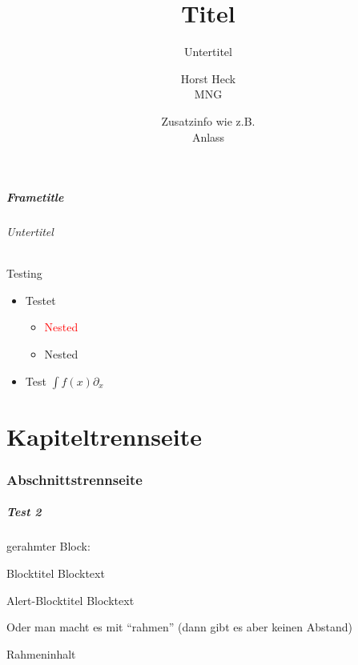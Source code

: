 \documentclass[mathsf,aspectratio=169]{beamer}
\title{Titel}
\subtitle{Untertitel}
\date[ISPN ’80]{Zusatzinfo wie z.B. \\ Anlass}
\author[Heck]{Horst Heck \\ MNG}
\institute{Technik und Informatik}
\begin{document}
	\begin{frame}
		\titlepage
	\end{frame}
	
	\begin{frame}[t]
		\frametitle{Frametitle}
		\framesubtitle{Untertitel}
		Testing
		\begin{itemize}
			\item Testet
			\begin{itemize}
				\item \textcolor{red}{Nested} 
				\pause
				\item Nested
			\end{itemize}
			\item Test $\int f(x) \partial_x$
		\end{itemize}
	\end{frame}
	
	\part{Kapiteltrennseite}
	\frame{\partpage}
	
	\section{Abschnittstrennseite}
		\begin{frame}
			\sectionpage
		\end{frame}
		\begin{frame}
			\frametitle{Test 2}
			gerahmter Block:
			\begin{block}{Blocktitel}
				        Blocktext
			\end{block}
			\begin{alertblock}{Alert-Blocktitel}
				        Blocktext
			\end{alertblock}
			Oder man macht es mit ``rahmen'' (dann gibt es aber keinen Abstand)
			\begin{rahmen}[frametitle={Rahmentitel}]
				Rahmeninhalt
			\end{rahmen}
		\end{frame}
\end{document}
